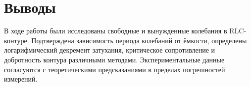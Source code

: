 \documentclass[a4paper]{article}
\begin{document}
\section{Выводы}

В ходе работы были исследованы свободные и вынужденные колебания в RLC-контуре. Подтверждена зависимость периода колебаний от ёмкости, определены логарифмический декремент затухания, критическое сопротивление и добротность контура различными методами. Экспериментальные данные согласуются с теоретическими предсказаниями в пределах погрешностей измерений.
\end{document}
